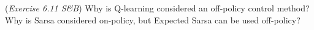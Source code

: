 (\textit{Exercise 6.11 S\&B})
 Why is Q-learning considered an off-policy control method?
 Why is Sarsa considered on-policy, but Expected Sarsa can be used off-policy?

